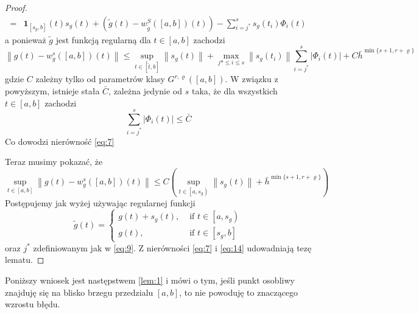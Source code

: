 \documentclass[oik, pdftex, robocza, man]{mgrwms}
\begin{document}
\begin{proof}
\begin{equation*}
\begin{aligned}
                =& \mathbf{1}_{\left[s_{g}, b\right]}(t) s_{g}(t)+\left(\tilde{g}(t)-w_{\tilde{g}}^{S}([a, b])(t)\right)-\sum_{i=j^{*}}^{s} s_{g}\left(t_{i}\right) \Phi_{i}(t)
            \end{aligned}
        \end{equation*}
        a ponieważ $\tilde{g}$ jest funkcją regularną dla $t \in[a, b]$ zachodzi
        \begin{equation*}
            \left\|g(t)-w_{g}^{s}([a, b])(t)\right\| \leq \sup _{t \in[\hat{t}, b]}\left\|s_{g}(t)\right\|+\max _{j * \leq i \leq s}\left\|s_{g}\left(t_{i}\right)\right\| \sum_{i=j^{*}}^{s}\left|\Phi_{i}(t)\right|+C \bar{h}^{\min \{s+1, r+\varrho\}}            
        \end{equation*}
        gdzie $C$ zależny tylko od parametrów klasy $G^{r, \varrho}([a, b])$. W związku z powyższym, istnieje stała $\bar{C}$, zależna jedynie od $s$ taka, że dla wszystkich $t \in[a, b]$ zachodzi
        \begin{equation} \label{eq:13}
            \sum_{i=j^{*}}^{s}\left|\Phi_{i}(t)\right| \leq \bar{C}            
        \end{equation}
        Co dowodzi nierówność \eqref{eq:7}

        Teraz musimy pokazać, że
        \begin{equation} \label{eq:14}
            \sup _{t \in[a, b]}\left\|g(t)-w_{g}^{s}([a, b])(t)\right\| \leq C\left(\sup _{t \in\left[a, s_{g}\right)}\left\|s_{g}(t)\right\|+\bar{h}^{\min \{s+1, r+\varrho\}}\right)
        \end{equation}
        Postępujemy jak wyżej używając regularnej funkcji
        \begin{equation} \label{eq:15}
            \tilde{g}(t)= \begin{cases}g(t)+s_{g}(t), & \text { if } t \in\left[a, s_{g}\right) \\ g(t), & \text { if } t \in\left[s_{g}, b\right]\end{cases}
        \end{equation}
        oraz $j^{*}$ zdefiniowanym jak w \eqref{eq:9}.
        Z nierówności \eqref{eq:7} i \eqref{eq:14} udowadniają tezę lematu.
    \end{proof}

    Poniższy wniosek jest następstwem \eqref{lem:1} i mówi o tym, jeśli punkt osobliwy znajduję się na blisko brzegu przedzialu $[a,b]$, to nie powoduję to znaczącego wzrostu błędu.
\end{document}
